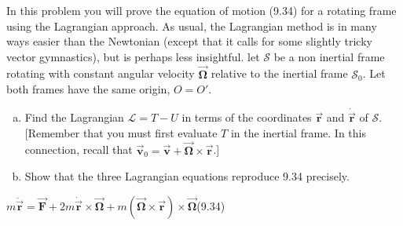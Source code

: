 \documentclass[11pt,letterpaper,boxed]{../hmcpsetrhino}
\let\oldvec\vec
\renewcommand{\vec}[1]{\oldvec{\mathbf{#1}}}
\begin{document}
\begin{problem}[9.11]
In this problem you will prove the equation of motion (9.34) for a rotating frame using the Lagrangian approach. As usual, the Lagrangian method is in many ways easier than the Newtonian (except that it calls for some slightly tricky vector gymnastics), but is perhaps less insightful. let $\mathcal{S}$ be a non inertial frame rotating with constant angular velocity $\vec \Omega$ relative to the inertial frame $\mathcal{S}_0$. Let both frames have the same origin, $O = O'$.
\begin{enumerate}[(a)]
\item Find the Lagrangian $\mathcal{L} = T-U$ in terms of the coordinates $\vec r$ and $\dot {\vec r}$ of $\mathcal{S}$. [Remember that you must first evaluate $T$ in the inertial frame. In this connection, recall that $\vec v_0 = \vec v + \vec \Omega \times \vec r$.] 
\item Show that the three Lagrangian equations reproduce 9.34 precisely.
\end{enumerate}
\vspace{0.2cm}
\hspace{1.5cm}\hfill $m\ddot {\vec r} = \vec F + 2 m \dot{\vec r} \times \vec \Omega + m(\vec \Omega \times \vec r) \times \vec \Omega$\hfill (9.34)
\end{problem}
\begin{solution}


\vfill
\end{solution}
\end{document}
